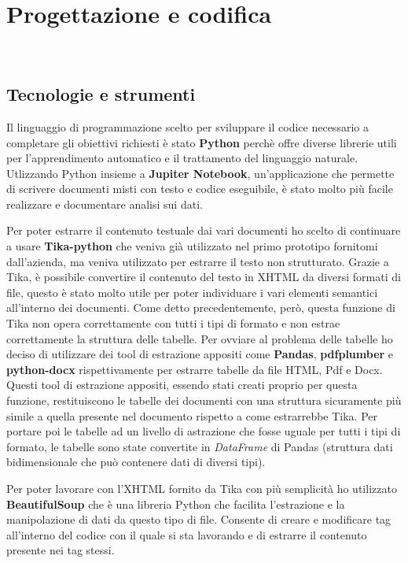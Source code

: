 \chapter{Progettazione e codifica}
\label{cap:progettazione-codifica}

\\

\section{Tecnologie e strumenti}
\label{sec:tecnologie-strumenti}

Il linguaggio di programmazione scelto per sviluppare il codice necessario a completare gli obiettivi richiesti è stato \textbf{Python} perchè offre diverse librerie utili per l'apprendimento automatico e il trattamento del linguaggio naturale.
Utlizzando Python insieme a \textbf{Jupiter Notebook}, un'applicazione che permette di scrivere documenti misti con testo e codice eseguibile, è stato molto più facile realizzare e documentare analisi sui dati.

\noindent Per poter estrarre il contenuto testuale dai vari documenti ho scelto di continuare a usare \textbf{Tika-python} che veniva già utilizzato nel primo prototipo fornitomi dall'azienda, ma veniva utilizzato per estrarre il testo non strutturato.
Grazie a Tika, è possibile convertire il contenuto del testo in XHTML da diversi formati di file, questo è stato molto utile per poter individuare i vari elementi semantici all'interno dei documenti.
Come detto precedentemente, però, questa funzione di Tika non opera correttamente con tutti i tipi di formato e non estrae correttamente la struttura delle tabelle.
Per ovviare al problema delle tabelle ho deciso di utilizzare dei tool di estrazione appositi come \textbf{Pandas}, \textbf{pdfplumber} e \textbf{python-docx} rispettivamente per estrarre tabelle da file HTML, Pdf e Docx.
Questi tool di estrazione appositi, essendo stati creati proprio per questa funzione, restituiscono le tabelle dei documenti con una struttura sicuramente più simile a quella presente nel documento rispetto a come estrarrebbe Tika.
Per portare poi le tabelle ad un livello di astrazione che fosse uguale per tutti i tipi di formato, le tabelle sono state convertite in \emph{DataFrame} di Pandas (struttura dati bidimensionale che può contenere dati di diversi tipi).

Per poter lavorare con l'XHTML fornito da Tika con più semplicità ho utilizzato \textbf{BeautifulSoup} che è una libreria Python che facilita l'estrazione e la manipolazione di dati da questo tipo di file.
Consente di creare e modificare tag all'interno del codice con il quale si sta lavorando e di estrarre il contenuto presente nei tag stessi.

